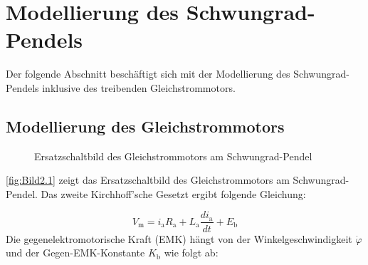 \pagestyle{aaron}
\section{Modellierung des Schwungrad-Pendels} \label{sec:Modellierung}

Der folgende Abschnitt beschäftigt sich mit der Modellierung des Schwungrad-Pendels inklusive des treibenden Gleichstrommotors.

\subsection{Modellierung des Gleichstrommotors}

\begin{figure}[H]
    \centering
    \caption[Ersatzschaltbild Gleichstrommotor]{Ersatzschaltbild des Gleichstrommotors am Schwungrad-Pendel}
    \label{fig:Bild2.1}
\end{figure}

\autoref{fig:Bild2.1} zeigt das Ersatzschaltbild des Gleichstrommotors am Schwungrad-Pendel. Das zweite Kirchhoff'sche Gesetzt ergibt folgende Gleichung:

\begin{equation} \label{eq:Gleichung2.1}
    V_{\mathrm{m}} = i_{\mathrm{a}} R_{\mathrm{a}} + L_{\mathrm{a}} \frac{di_{\mathrm{a}}}{dt} + E_{\mathrm{b}}
\end{equation}
\newline
Die gegenelektromotorische Kraft (EMK) hängt von der Winkelgeschwindigkeit $\dot\varphi$ und der Gegen-EMK-Konstante $K_{\mathrm{b}}$ wie folgt ab:

